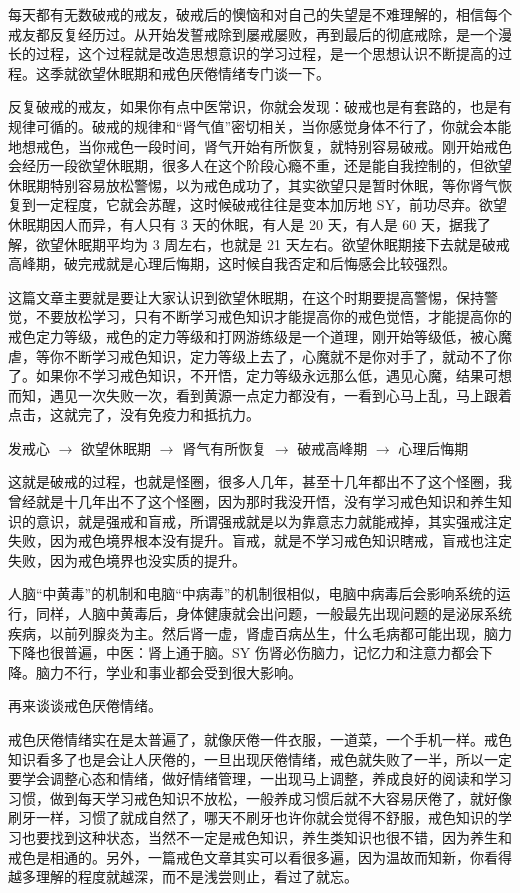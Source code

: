 \documentclass[fontset=founder]{ctexart}
\begin{document}
每天都有无数破戒的戒友，破戒后的懊恼和对自己的失望是不难理解的，相信每个戒友都反复经历过。从开始发誓戒除到屡戒屡败，再到最后的彻底戒除，是一个漫长的过程，这个过程就是改造思想意识的学习过程，是一个思想认识不断提高的过程。这季就欲望休眠期和戒色厌倦情绪专门谈一下。

反复破戒的戒友，如果你有点中医常识，你就会发现：破戒也是有套路的，也是有规律可循的。破戒的规律和“肾气值”密切相关，当你感觉身体不行了，你就会本能地想戒色，当你戒色一段时间，肾气开始有所恢复，就特别容易破戒。刚开始戒色会经历一段欲望休眠期，很多人在这个阶段心瘾不重，还是能自我控制的，但欲望休眠期特别容易放松警惕，以为戒色成功了，其实欲望只是暂时休眠，等你肾气恢复到一定程度，它就会苏醒，这时候破戒往往是变本加厉地 SY，前功尽弃。欲望休眠期因人而异，有人只有 3 天的休眠，有人是 20 天，有人是 60 天，据我了解，欲望休眠期平均为 3 周左右，也就是 21 天左右。欲望休眠期接下去就是破戒高峰期，破完戒就是心理后悔期，这时候自我否定和后悔感会比较强烈。

这篇文章主要就是要让大家认识到欲望休眠期，在这个时期要提高警惕，保持警觉，不要放松学习，只有不断学习戒色知识才能提高你的戒色觉悟，才能提高你的戒色定力等级，戒色的定力等级和打网游练级是一个道理，刚开始等级低，被心魔虐，等你不断学习戒色知识，定力等级上去了，心魔就不是你对手了，就动不了你了。如果你不学习戒色知识，不开悟，定力等级永远那么低，遇见心魔，结果可想而知，遇见一次失败一次，看到黄源一点定力都没有，一看到心马上乱，马上跟着点击，这就完了，没有免疫力和抵抗力。

\begin{center}
    发戒心 $\to$ 欲望休眠期 $\to$ 肾气有所恢复 $\to$ 破戒高峰期 $\to$ 心理后悔期
\end{center}

这就是破戒的过程，也就是怪圈，很多人几年，甚至十几年都出不了这个怪圈，我曾经就是十几年出不了这个怪圈，因为那时我没开悟，没有学习戒色知识和养生知识的意识，就是强戒和盲戒，所谓强戒就是以为靠意志力就能戒掉，其实强戒注定失败，因为戒色境界根本没有提升。盲戒，就是不学习戒色知识瞎戒，盲戒也注定失败，因为戒色境界也没实质的提升。

人脑“中黄毒”的机制和电脑“中病毒”的机制很相似，电脑中病毒后会影响系统的运行，同样，人脑中黄毒后，身体健康就会出问题，一般最先出现问题的是泌尿系统疾病，以前列腺炎为主。然后肾一虚，肾虚百病丛生，什么毛病都可能出现，脑力下降也很普遍，中医：肾上通于脑。SY 伤肾必伤脑力，记忆力和注意力都会下降。脑力不行，学业和事业都会受到很大影响。

再来谈谈戒色厌倦情绪。

戒色厌倦情绪实在是太普遍了，就像厌倦一件衣服，一道菜，一个手机一样。戒色知识看多了也是会让人厌倦的，一旦出现厌倦情绪，戒色就失败了一半，所以一定要学会调整心态和情绪，做好情绪管理，一出现马上调整，养成良好的阅读和学习习惯，做到每天学习戒色知识不放松，一般养成习惯后就不大容易厌倦了，就好像刷牙一样，习惯了就成自然了，哪天不刷牙也许你就会觉得不舒服，戒色知识的学习也要找到这种状态，当然不一定是戒色知识，养生类知识也很不错，因为养生和戒色是相通的。另外，一篇戒色文章其实可以看很多遍，因为温故而知新，你看得越多理解的程度就越深，而不是浅尝则止，看过了就忘。
\end{document}
